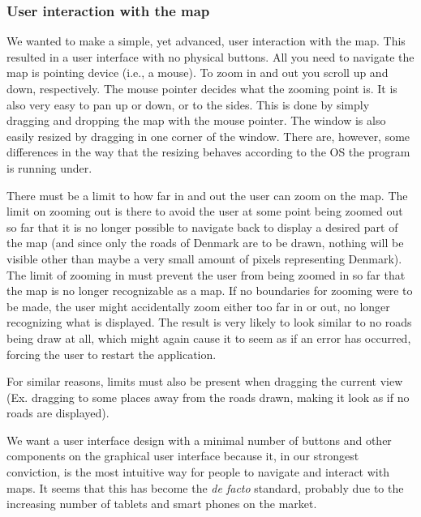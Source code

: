 \subsubsection{User interaction with the map}
We wanted to make a simple, yet advanced, user interaction with the map. This resulted in a user interface with no physical buttons. All you need to navigate the map is pointing device (i.e., a mouse). To zoom in and out you scroll up and down, respectively. The mouse pointer decides what the zooming point is. It is also very easy to pan up or down, or to the sides. This is done by simply dragging and dropping the map with the mouse pointer. The window is also easily resized by dragging in one corner of the window. There are, however, some differences in the way that the resizing behaves according to the OS the program is running under.

There must be a limit to how far in and out the user can zoom on the map. The limit on zooming out is there to avoid the user at some point being zoomed out so far that it is no longer possible to navigate back to display a desired part of the map (and since only the roads of Denmark are to be drawn, nothing will be visible other than maybe a very small amount of pixels representing Denmark). The limit of zooming in must prevent the user from being zoomed in so far that the map is no longer recognizable as a map. If no boundaries for zooming were to be made, the user might accidentally zoom either too far in or out, no longer recognizing what is displayed. The result is very likely to look similar to no roads being draw at all, which might again cause it to seem as if an error has occurred, forcing the user to restart the application.

For similar reasons, limits must also be present when dragging the current view (Ex. dragging to some places away from the roads drawn, making it look as if no roads are displayed).

We want a user interface design with a minimal number of buttons and other components on the graphical user interface because it, in our strongest conviction, is the most intuitive way for people to navigate and interact with maps. It seems that this has become the \textit{de facto} standard, probably due to the increasing number of tablets and smart phones on the market.

